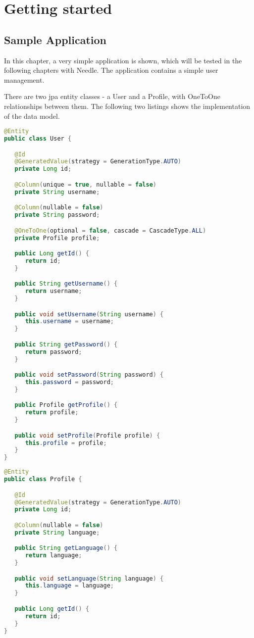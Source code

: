 \chapter{Getting started}

\section{Sample Application}
\label{sec: Sample Application}
In this chapter, a very simple application is shown, which will be tested in the following chapters with Needle. 
The application contains a simple user management.   

\parskip 14pt
\parindent 0pt
There are two jpa entity classes - a User and a Profile, with OneToOne relationships between them. 
The following two listings shows the implementation of the data model.

\begin{lstlisting}[language={JAVA},caption=The user entity]
@Entity
public class User {

   @Id
   @GeneratedValue(strategy = GenerationType.AUTO)
   private Long id;

   @Column(unique = true, nullable = false)
   private String username;

   @Column(nullable = false)
   private String password;

   @OneToOne(optional = false, cascade = CascadeType.ALL)
   private Profile profile;

   public Long getId() {
      return id;
   }

   public String getUsername() {
      return username;
   }

   public void setUsername(String username) {
      this.username = username;
   }

   public String getPassword() {
      return password;
   }

   public void setPassword(String password) {
      this.password = password;
   }

   public Profile getProfile() {
      return profile;
   }

   public void setProfile(Profile profile) {
      this.profile = profile;
   }
}
\end{lstlisting}


\begin{lstlisting}[language={JAVA},caption=The profile entity]
@Entity
public class Profile {

   @Id
   @GeneratedValue(strategy = GenerationType.AUTO)
   private Long id;

   @Column(nullable = false)
   private String language;

   public String getLanguage() {
      return language;
   }

   public void setLanguage(String language) {
      this.language = language;
   }

   public Long getId() {
      return id;
   }
}
\end{lstlisting}


